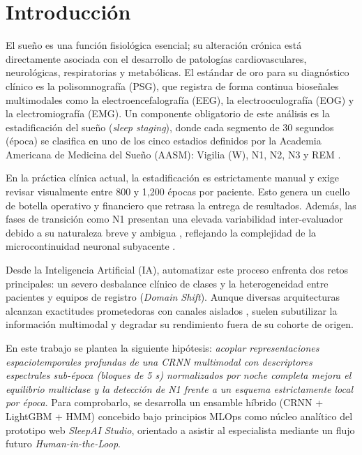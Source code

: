 \documentclass[conference]{IEEEtran}
\begin{document}
\IEEEpeerreviewmaketitle

\section{Introducción}
El sueño es una función fisiológica esencial; su alteración crónica está directamente asociada con el desarrollo de patologías cardiovasculares, neurológicas, respiratorias y metabólicas. El estándar de oro para su diagnóstico clínico es la polisomnografía (PSG), que registra de forma continua bioseñales multimodales como la electroencefalografía (EEG), la electrooculografía (EOG) y la electromiografía (EMG). Un componente obligatorio de este análisis es la estadificación del sueño (\textit{sleep staging}), donde cada segmento de 30 segundos (época) se clasifica en uno de los cinco estadios definidos por la Academia Americana de Medicina del Sueño (AASM): Vigilia (W), N1, N2, N3 y REM \cite{berry2020}.

En la práctica clínica actual, la estadificación es estrictamente manual y exige revisar visualmente entre 800 y 1,200 épocas por paciente. Esto genera un cuello de botella operativo y financiero que retrasa la entrega de resultados. Además, las fases de transición como N1 presentan una elevada variabilidad inter-evaluador debido a su naturaleza breve y ambigua \cite{berry2020}, reflejando la complejidad de la microcontinuidad neuronal subyacente \cite{kemp2000}.

Desde la Inteligencia Artificial (IA), automatizar este proceso enfrenta dos retos principales: un severo desbalance clínico de clases y la heterogeneidad entre pacientes y equipos de registro (\textit{Domain Shift}). Aunque diversas arquitecturas alcanzan exactitudes prometedoras con canales aislados \cite{supratak2020}, suelen subutilizar la información multimodal y degradar su rendimiento fuera de su cohorte de origen.

En este trabajo se plantea la siguiente hipótesis: \textit{acoplar representaciones espaciotemporales profundas de una CRNN multimodal con descriptores espectrales sub-época (bloques de 5 s) normalizados por noche completa mejora el equilibrio multiclase y la detección de N1 frente a un esquema estrictamente local por época}. Para comprobarlo, se desarrolla un ensamble híbrido (CRNN + LightGBM \cite{ke2017} + HMM) concebido bajo principios MLOps como núcleo analítico del prototipo web \textit{SleepAI Studio}, orientado a asistir al especialista mediante un flujo futuro \textit{Human-in-the-Loop}.
\end{document}
